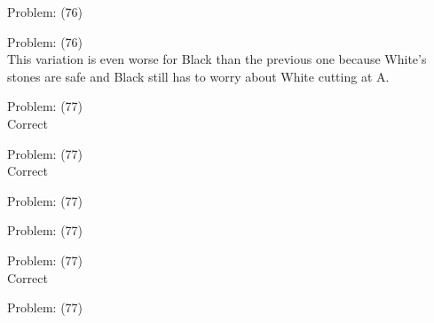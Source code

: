 \documentclass[11pt]{article}
\begin{document}
\begin{minipage}[t]{0.5\textwidth}
  {\centering
  
Problem: (76)\\
  }
\end{minipage}
\begin{minipage}[t]{0.5\textwidth}
  {\centering
  
Problem: (76)\\
This variation is even worse for Black than the previous one because White's stones are safe and Black still has to worry about White cutting at A.\\
  }
\end{minipage}
\begin{minipage}[t]{0.5\textwidth}
  {\centering
  
Problem: (77)\\
Correct\\
  }
\end{minipage}
\begin{minipage}[t]{0.5\textwidth}
  {\centering
  
Problem: (77)\\
Correct\\
  }
\end{minipage}
\begin{minipage}[t]{0.5\textwidth}
  {\centering
  
Problem: (77)\\
  }
\end{minipage}
\begin{minipage}[t]{0.5\textwidth}
  {\centering
  
Problem: (77)\\
  }
\end{minipage}
\begin{minipage}[t]{0.5\textwidth}
  {\centering
  
Problem: (77)\\
Correct\\
  }
\end{minipage}
\begin{minipage}[t]{0.5\textwidth}
  {\centering
  
Problem: (77)\\
  }
\end{minipage}
\end{document}
